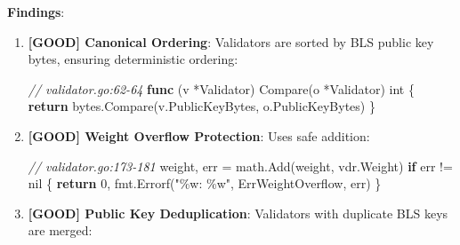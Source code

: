 \documentclass[
]{article}
\newenvironment{Shaded}{}{}
\newcommand{\CommentTok}[1]{\textcolor[rgb]{0.38,0.63,0.69}{\textit{#1}}}
\newcommand{\ControlFlowTok}[1]{\textcolor[rgb]{0.00,0.44,0.13}{\textbf{#1}}}
\newcommand{\DataTypeTok}[1]{\textcolor[rgb]{0.56,0.13,0.00}{#1}}
\newcommand{\DecValTok}[1]{\textcolor[rgb]{0.25,0.63,0.44}{#1}}
\newcommand{\KeywordTok}[1]{\textcolor[rgb]{0.00,0.44,0.13}{\textbf{#1}}}
\newcommand{\NormalTok}[1]{#1}
\newcommand{\OperatorTok}[1]{\textcolor[rgb]{0.40,0.40,0.40}{#1}}
\newcommand{\OtherTok}[1]{\textcolor[rgb]{0.00,0.44,0.13}{#1}}
\newcommand{\StringTok}[1]{\textcolor[rgb]{0.25,0.44,0.63}{#1}}
\begin{document}
\textbf{Findings}:

\begin{enumerate}
\def\labelenumi{\arabic{enumi}.}
\item
  \textbf{{[}GOOD{]} Canonical Ordering}: Validators are sorted by BLS
  public key bytes, ensuring deterministic ordering:

\begin{Shaded}
\begin{Highlighting}[]
\CommentTok{// validator.go:62{-}64}
\KeywordTok{func} \OperatorTok{(}\NormalTok{v }\OperatorTok{*}\NormalTok{Validator}\OperatorTok{)}\NormalTok{ Compare}\OperatorTok{(}\NormalTok{o }\OperatorTok{*}\NormalTok{Validator}\OperatorTok{)} \DataTypeTok{int} \OperatorTok{\{}
    \ControlFlowTok{return}\NormalTok{ bytes}\OperatorTok{.}\NormalTok{Compare}\OperatorTok{(}\NormalTok{v}\OperatorTok{.}\NormalTok{PublicKeyBytes}\OperatorTok{,}\NormalTok{ o}\OperatorTok{.}\NormalTok{PublicKeyBytes}\OperatorTok{)}
\OperatorTok{\}}
\end{Highlighting}
\end{Shaded}
\item
  \textbf{{[}GOOD{]} Weight Overflow Protection}: Uses safe addition:

\begin{Shaded}
\begin{Highlighting}[]
\CommentTok{// validator.go:173{-}181}
\NormalTok{weight}\OperatorTok{,}\NormalTok{ err }\OperatorTok{=}\NormalTok{ math}\OperatorTok{.}\NormalTok{Add}\OperatorTok{(}\NormalTok{weight}\OperatorTok{,}\NormalTok{ vdr}\OperatorTok{.}\NormalTok{Weight}\OperatorTok{)}
\ControlFlowTok{if}\NormalTok{ err }\OperatorTok{!=} \OtherTok{nil} \OperatorTok{\{}
    \ControlFlowTok{return} \DecValTok{0}\OperatorTok{,}\NormalTok{ fmt}\OperatorTok{.}\NormalTok{Errorf}\OperatorTok{(}\StringTok{"\%w: \%w"}\OperatorTok{,}\NormalTok{ ErrWeightOverflow}\OperatorTok{,}\NormalTok{ err}\OperatorTok{)}
\OperatorTok{\}}
\end{Highlighting}
\end{Shaded}
\item
  \textbf{{[}GOOD{]} Public Key Deduplication}: Validators with
  duplicate BLS keys are merged:


\end{enumerate}
\end{document}
